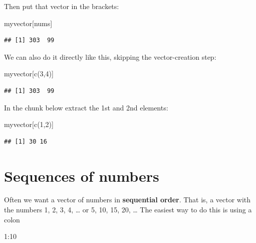 \documentclass[
]{book}
\newenvironment{Shaded}{\begin{snugshade}}{\end{snugshade}}
\newcommand{\DecValTok}[1]{\textcolor[rgb]{0.00,0.00,0.81}{#1}}
\newcommand{\FunctionTok}[1]{\textcolor[rgb]{0.00,0.00,0.00}{#1}}
\newcommand{\NormalTok}[1]{#1}
\newcommand{\SpecialCharTok}[1]{\textcolor[rgb]{0.00,0.00,0.00}{#1}}
\begin{document}
Then put that vector in the brackets:

\begin{Shaded}
\begin{Highlighting}[]
\NormalTok{myvector[nums]}
\end{Highlighting}
\end{Shaded}

\begin{verbatim}
## [1] 303  99
\end{verbatim}

We can also do it directly like this, skipping the vector-creation step:

\begin{Shaded}
\begin{Highlighting}[]
\NormalTok{myvector[}\FunctionTok{c}\NormalTok{(}\DecValTok{3}\NormalTok{,}\DecValTok{4}\NormalTok{)]}
\end{Highlighting}
\end{Shaded}

\begin{verbatim}
## [1] 303  99
\end{verbatim}

In the chunk below extract the 1st and 2nd elements:

\begin{Shaded}
\begin{Highlighting}[]
\NormalTok{myvector[}\FunctionTok{c}\NormalTok{(}\DecValTok{1}\NormalTok{,}\DecValTok{2}\NormalTok{)]}
\end{Highlighting}
\end{Shaded}

\begin{verbatim}
## [1] 30 16
\end{verbatim}

\hypertarget{sequences-of-numbers}{%
\section{Sequences of numbers}\label{sequences-of-numbers}}

Often we want a vector of numbers in \textbf{sequential order}. That is, a vector with the numbers 1, 2, 3, 4, \ldots{} or 5, 10, 15, 20, \ldots{} The easiest way to do this is using a colon

\begin{Shaded}
\begin{Highlighting}[]
\DecValTok{1}\SpecialCharTok{:}\DecValTok{10}
\end{Highlighting}
\end{Shaded}
\end{document}
